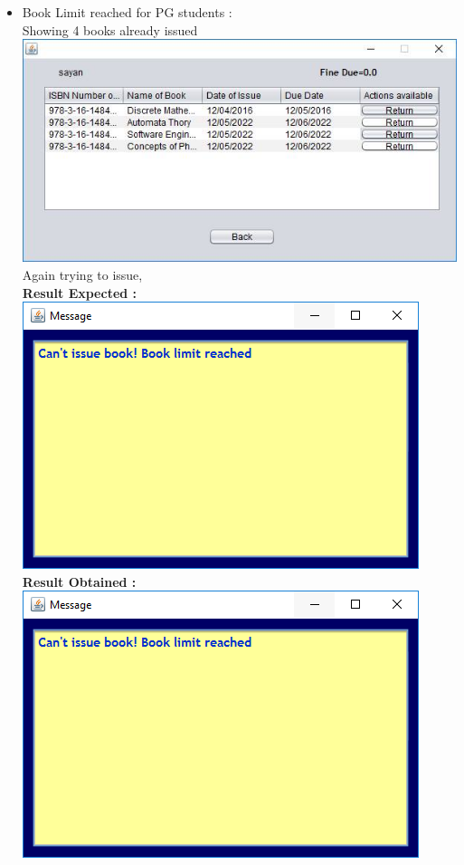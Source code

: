 \documentclass{article}
\begin{document}
\begin{enumerate}
\begin{itemize}
\item Book Limit reached for PG students :\\
Showing 4 books already issued\\
\includegraphics[scale=0.8]{images/BookLimitPG.png}\\
Again trying to issue,\\
\textbf{Result Expected :}\\
\includegraphics[scale=0.8]{images/BookLimitError.PNG}\\
\textbf{Result Obtained :}\\
\includegraphics[scale=0.8]{images/BookLimitError.PNG}\\

\end{itemize}
\end{enumerate}
\end{document}
